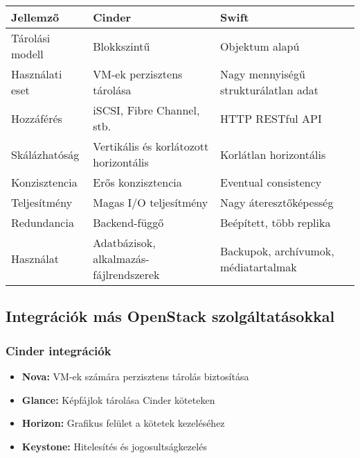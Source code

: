 \documentclass[a4paper,12pt]{article}
\begin{document}
    \begin{tabular}{|p{}|p{}|p{}|}
        \hline
        \textbf{Jellemző} & \textbf{Cinder}                        & \textbf{Swift}                       \\
        \hline
        Tárolási modell   & Blokkszintű                            & Objektum alapú                       \\
        \hline
        Használati eset   & VM-ek perzisztens tárolása             & Nagy mennyiségű strukturálatlan adat \\
        \hline
        Hozzáférés        & iSCSI, Fibre Channel, stb.             & HTTP RESTful API                     \\
        \hline
        Skálázhatóság     & Vertikális és korlátozott horizontális & Korlátlan horizontális               \\
        \hline
        Konzisztencia     & Erős konzisztencia                     & Eventual consistency                 \\
        \hline
        Teljesítmény      & Magas I/O teljesítmény                 & Nagy áteresztőképesség               \\
        \hline
        Redundancia       & Backend-függő                          & Beépített, több replika              \\
        \hline
        Használat         & Adatbázisok, alkalmazás-fájlrendszerek & Backupok, archívumok, médiatartalmak \\
        \hline
    \end{tabular}

    \subsection{Integrációk más OpenStack szolgáltatásokkal}

    \subsubsection{Cinder integrációk}

    \begin{itemize}
        \item \textbf{Nova:} VM-ek számára perzisztens tárolás biztosítása
        \item \textbf{Glance:} Képfájlok tárolása Cinder köteteken
        \item \textbf{Horizon:} Grafikus felület a kötetek kezeléséhez
        \item \textbf{Keystone:} Hitelesítés és jogosultságkezelés
    \end{itemize}
\end{document}
